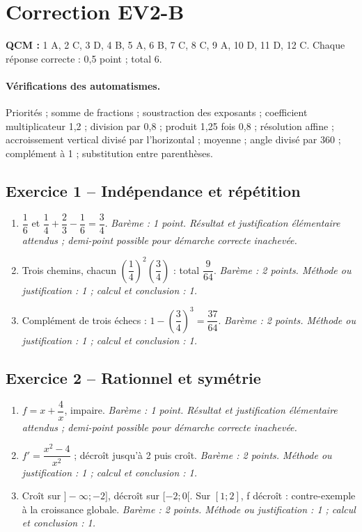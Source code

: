 \clearpage\section*{Correction EV2-B}\label{EV2-B-CORR}
\textbf{QCM :} 1 A, 2 C, 3 D, 4 B, 5 A, 6 B, 7 C, 8 C, 9 A, 10 D, 11 D, 12 C. Chaque réponse correcte : 0,5 point ; total 6.
\paragraph{Vérifications des automatismes.} Priorités ; somme de fractions ; soustraction des exposants ; coefficient multiplicateur 1,2 ; division par 0,8 ; produit 1,25 fois 0,8 ; résolution affine ; accroissement vertical divisé par l’horizontal ; moyenne ; angle divisé par 360 ; complément à 1 ; substitution entre parenthèses.
\subsection*{Exercice 1 -- Indépendance et répétition}
\begin{enumerate}
\item $\dfrac{1}{6}$ et $\dfrac{1}{4}+\dfrac{2}{3}-\dfrac{1}{6}=\dfrac{3}{4}$. \textit{Barème : 1 point. Résultat et justification élémentaire attendus ; demi-point possible pour démarche correcte inachevée.}
\item Trois chemins, chacun $(\dfrac{1}{4})^2(\dfrac{3}{4})$ : total $\dfrac{9}{64}$. \textit{Barème : 2 points. Méthode ou justification : 1 ; calcul et conclusion : 1.}
\item Complément de trois échecs : $1-(\dfrac{3}{4})^3=\dfrac{37}{64}$. \textit{Barème : 2 points. Méthode ou justification : 1 ; calcul et conclusion : 1.}
\end{enumerate}
\subsection*{Exercice 2 -- Rationnel et symétrie}
\begin{enumerate}
\item $f=x+\dfrac{4}{x}$, impaire. \textit{Barème : 1 point. Résultat et justification élémentaire attendus ; demi-point possible pour démarche correcte inachevée.}
\item $f\prime =\dfrac{x^2-4}{x^2}$ ; décroît jusqu’à 2 puis croît. \textit{Barème : 2 points. Méthode ou justification : 1 ; calcul et conclusion : 1.}
\item Croît sur $]-\infty;-2]$, décroît sur $[-2;0[$. Sur $[1;2]$, f décroît : contre-exemple à la croissance globale. \textit{Barème : 2 points. Méthode ou justification : 1 ; calcul et conclusion : 1.}
\end{enumerate}
